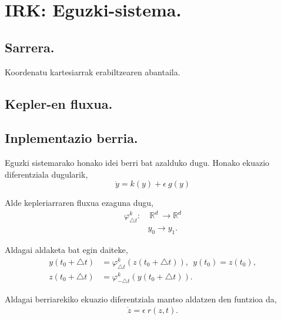 \chapter{IRK: Eguzki-sistema.}

\section{Sarrera.}

Koordenatu kartesiarrak erabiltzearen abantaila.

\section{Kepler-en fluxua.}

\section{Inplementazio berria.}

Eguzki sistemarako honako idei berri bat azalduko dugu. Honako ekuazio diferentziala dugularik,
\begin{equation*}
\dot{y}=k(y)+\epsilon \ g(y)
\end{equation*}

Alde kepleriarraren fluxua ezaguna dugu,
\begin{align*}
\varphi_{\triangle t}^k:&  \ \mathbb{R}^d \ \longrightarrow \mathbb{R}^d  \\
&  y_0 \longrightarrow y_1. 
\end{align*}

Aldagai aldaketa bat egin daiteke,
\begin{align*}
y(t_0+\triangle t) &= \varphi _{\triangle t}^k(z(t_0+\triangle t)), \ \ y(t_0)=z(t_0), \\
z(t_0+\triangle t) &= \varphi _{-\triangle t}^k(y(t_0+\triangle t)).
\end{align*}

Aldagai berriarekiko ekuazio diferentziala mantso aldatzen den funtzioa da,
\begin{align*}
\dot{z}=\epsilon \ r(z,t).
\end{align*} 

